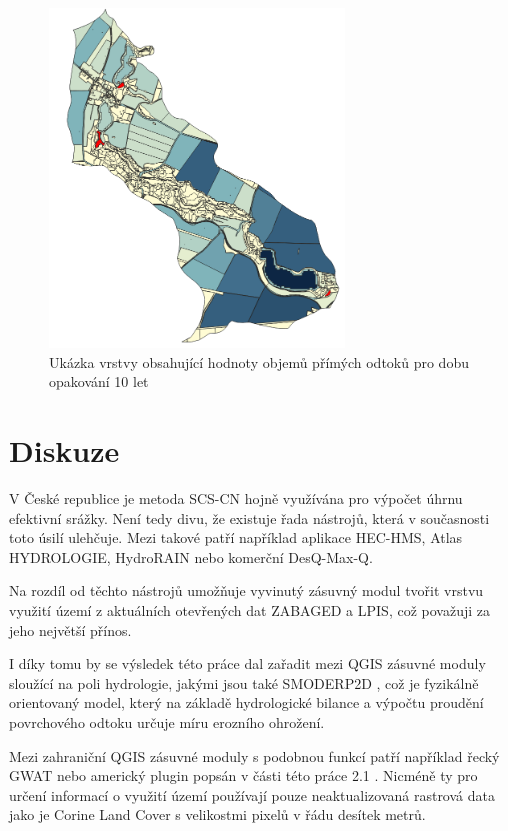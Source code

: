 \documentclass[a4paper,oneside,12pt]{book}
\begin{document}
\begin{figure}[H] \label{obr29}
\centering
\includegraphics[height=9cm]{pictures/casestudy6.png}
\caption{Ukázka vrstvy obsahující hodnoty objemů přímých odtoků pro dobu opakování 10 let}
\label{cs6}
\end{figure}

\chapter*{Diskuze} \label{discusion}
\hspace{10mm} V České republice je metoda SCS-CN hojně využívána pro výpočet úhrnu efektivní srážky. Není tedy divu, že existuje řada nástrojů, která v současnosti toto úsilí ulehčuje. Mezi takové patří například aplikace HEC-HMS, Atlas HYDROLOGIE, HydroRAIN nebo komerční DesQ-Max-Q. \cite{MNYDGwleJOjKLRU2}

\hspace{10mm} Na rozdíl od těchto nástrojů umožňuje vyvinutý zásuvný modul tvořit vrstvu využití území z aktuálních otevřených dat ZABAGED a LPIS, což považuji za jeho největší přínos. 

\hspace{10mm} I díky tomu by se výsledek této práce dal zařadit mezi QGIS zásuvné moduly sloužící na poli hydrologie, jakými jsou také SMODERP2D \cite{Kavka2024}, což je fyzikálně orientovaný model, který na základě hydrologické bilance a výpočtu proudění povrchového odtoku určuje míru erozního ohrožení.

\hspace{10mm} Mezi zahraniční QGIS zásuvné moduly s podobnou funkcí patří například řecký GWAT \cite{lymperis2024} nebo americký plugin \cite{siddiqui2020} popsán v části této práce 2.1 . Nicméně ty pro určení informací o využití území používají pouze neaktualizovaná rastrová data jako je Corine Land Cover s velikostmi pixelů v řádu desítek metrů.
\end{document}
